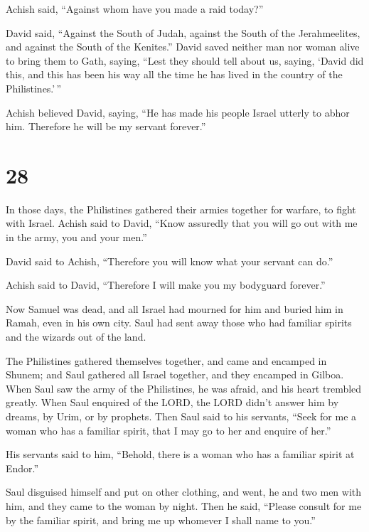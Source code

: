  Achish said, ``Against whom have you made a raid today?''

David said, ``Against the South of Judah, against the South of the
Jerahmeelites, and against the South of the Kenites.'' 
David saved neither man nor woman alive to bring them to Gath, saying,
``Lest they should tell about us, saying, `David did this, and this has
been his way all the time he has lived in the country of the
Philistines.'\,''

 Achish believed David, saying, ``He has made his people
Israel utterly to abhor him. Therefore he will be my servant forever.''

\hypertarget{section-27}{%
\section{28}\label{section-27}}

 In those days, the Philistines gathered their armies
together for warfare, to fight with Israel. Achish said to David, ``Know
assuredly that you will go out with me in the army, you and your men.''

 David said to Achish, ``Therefore you will know what your
servant can do.''

Achish said to David, ``Therefore I will make you my bodyguard
forever.''

 Now Samuel was dead, and all Israel had mourned for him and
buried him in Ramah, even in his own city. Saul had sent away those who
had familiar spirits and the wizards out of the land.

 The Philistines gathered themselves together, and came and
encamped in Shunem; and Saul gathered all Israel together, and they
encamped in Gilboa.  When Saul saw the army of the
Philistines, he was afraid, and his heart trembled greatly. 
When Saul enquired of the LORD, the LORD didn't answer him by dreams, by
Urim, or by prophets.  Then Saul said to his servants,
``Seek for me a woman who has a familiar spirit, that I may go to her
and enquire of her.''

His servants said to him, ``Behold, there is a woman who has a familiar
spirit at Endor.''

 Saul disguised himself and put on other clothing, and went,
he and two men with him, and they came to the woman by night. Then he
said, ``Please consult for me by the familiar spirit, and bring me up
whomever I shall name to you.''

